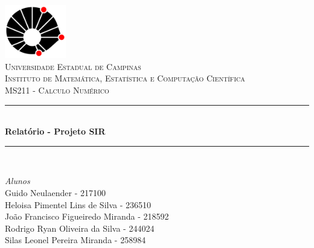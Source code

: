 \begin{titlepage} %
	\newcommand{\HRule}{\rule{\linewidth}{0.5mm}} %
	
	\center %
	

	\includegraphics[width=0.2\textwidth]{unicamp_logo.png}\\[1cm] %
	
	\textsc{\LARGE Universidade Estadual de Campinas}\\[1.5cm] %
	
	\textsc{\Large Instituto de Matemática, Estatística e Computação Científica}\\[0.5cm] %
	
	\textsc{\large MS211 - Calculo Numérico}\\[0.5cm] %
	
	
	\HRule\\[0.4cm]
	
	{\huge\bfseries Relatório - Projeto SIR}\\[0.4cm] %
	
	\HRule\\[1.5cm]
	
	
		\begin{flushleft}
			\large
			\textit{Alunos}\\
			Guido Neulaender - 217100 \\
			Heloisa Pimentel Lins de Silva - 236510 \\
			João Francisco Figueiredo Miranda - 218592 \\
			Rodrigo Ryan Oliveira da Silva - 244024 \\
			Silas Leonel Pereira Miranda - 258984
		\end{flushleft}
	~
	

\end{titlepage}
